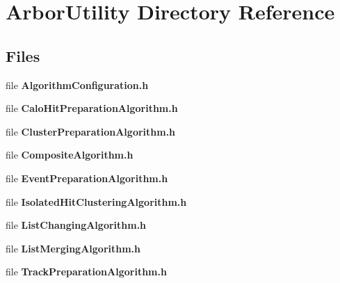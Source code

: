 \section{Arbor\+Utility Directory Reference}
\label{dir_705414d4fbd3571941445f9e1d223259}
\subsection*{Files}
\begin{DoxyCompactItemize}
\item 
file {\bf Algorithm\+Configuration.\+h}
\item 
file {\bf Calo\+Hit\+Preparation\+Algorithm.\+h}
\item 
file {\bf Cluster\+Preparation\+Algorithm.\+h}
\item 
file {\bf Composite\+Algorithm.\+h}
\item 
file {\bf Event\+Preparation\+Algorithm.\+h}
\item 
file {\bf Isolated\+Hit\+Clustering\+Algorithm.\+h}
\item 
file {\bf List\+Changing\+Algorithm.\+h}
\item 
file {\bf List\+Merging\+Algorithm.\+h}
\item 
file {\bf Track\+Preparation\+Algorithm.\+h}
\end{DoxyCompactItemize}
